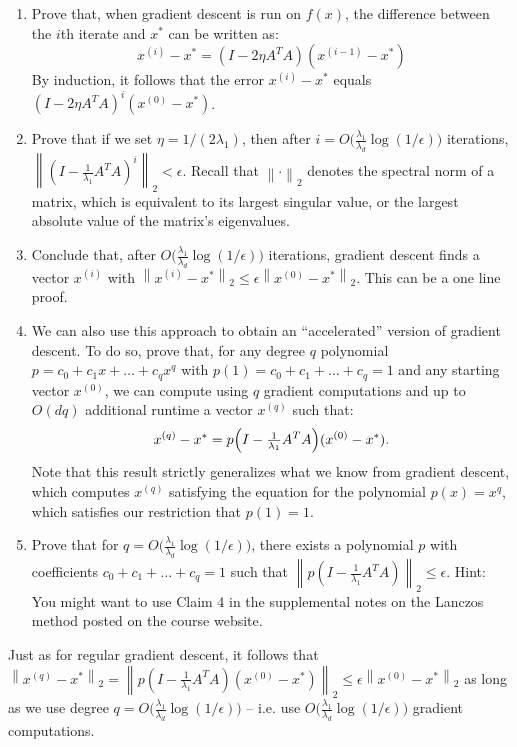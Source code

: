 \documentclass[10pt]{article}
\newcommand{\norm}[1]{\left\lVert #1\right\rVert}
\begin{document}
\begin{enumerate}
	\item Prove that, when gradient descent is run on $f(x)$, the difference between the $i$th iterate and $x^*$ can be written as:
	\[
	x^{(i)} - x^* = (I - 2\eta A^T A)(x^{(i-1)} - x^*)
	\]
	By induction, it follows that the error $x^{(i)} - x^*$ equals $(I - 2\eta A^T A)^i (x^{(0)} - x^*)$.
	\item Prove that if we set $\eta = 1/(2\lambda_1)$, then after $i = O\bigl(\tfrac{\lambda_1}{\lambda_d}\log(1/\epsilon)\bigr)$ iterations, $\norm{(I - \tfrac{1}{\lambda_1} A^T A)^i}_2 < \epsilon$. Recall that $\norm{\cdot}_2$ denotes the spectral norm of a matrix, which is equivalent to its largest singular value, or the largest absolute value of the matrix's eigenvalues.
	\item Conclude that, after $O\bigl(\tfrac{\lambda_1}{\lambda_d}\log(1/\epsilon)\bigr)$ iterations, gradient descent finds a vector $x^{(i)}$ with $\norm{x^{(i)} - x^*}_2 \le \epsilon\norm{x^{(0)} - x^*}_2$. This can be a one line proof.
	\item We can also use this approach to obtain an ``accelerated'' version of gradient descent. To do so, prove that, for any degree $q$ polynomial $p = c_0 + c_1 x + \ldots + c_q x^q$ with $p(1) = c_0 + c_1 + \ldots + c_q = 1$ and any starting vector $x^{(0)}$, we can compute using $q$ gradient computations and up to $O(dq)$ additional runtime a vector $x^{(q)}$ such that:
	\[
	x^{(q)} - x^* = p\Bigl(I - \tfrac{1}{\lambda_1} A^T A\Bigr)(x^{(0)} - x^*).
	\]
	Note that this result strictly generalizes what we know from gradient descent, which computes $x^{(q)}$ satisfying the equation for the polynomial $p(x) = x^q$, which satisfies our restriction that $p(1) = 1$.
	\item Prove that for $q = O\bigl(\tfrac{\lambda_1}{\lambda_d}\log(1/\epsilon)\bigr)$, there exists a polynomial $p$ with coefficients $c_0 + c_1 + \ldots + c_q = 1$ such that $\norm{p(I - \tfrac{1}{\lambda_1} A^T A)}_2 \le \epsilon$. Hint: You might want to use Claim 4 in the supplemental notes on the Lanczos method posted on the course website.
\end{enumerate}

Just as for regular gradient descent, it follows that $\norm{x^{(q)} - x^*}_2 = \norm{p(I - \tfrac{1}{\lambda_1} A^T A)(x^{(0)} - x^*)}_2 \le \epsilon\norm{x^{(0)} - x^*}_2$ as long as we use degree $q = O\bigl(\tfrac{\lambda_1}{\lambda_d}\log(1/\epsilon)\bigr)$ -- i.e. use $O\bigl(\tfrac{\lambda_1}{\lambda_d}\log(1/\epsilon)\bigr)$ gradient computations.
\end{document}
